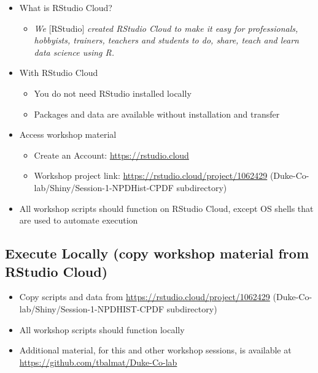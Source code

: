 \documentclass[10pt, letterpaper]{article}
\begin{document}
\begin{spacing}{1.0}
\begin{itemize}
    \item What is RStudio Cloud?
    \begin{itemize}
        \item \textit{We} {[RStudio]} \textit{created RStudio Cloud to make it easy for professionals, hobbyists, trainers, teachers and students to do, share, teach and learn data science using R.}
    \end{itemize}
    \item With RStudio Cloud
    \begin{itemize}
        \item You do not need RStudio installed locally
        \item Packages and data are available without installation and transfer
    \end{itemize}
    \item Access workshop material
    \begin{itemize}
        \item Create an Account:  \url{https://rstudio.cloud}
        \item Workshop project link:  \url{https://rstudio.cloud/project/1062429} (Duke-Co-lab/Shiny/Session-1-NPDHist-CPDF subdirectory)
    \end{itemize}
    \item All workshop scripts should function on RStudio Cloud, except OS shells that are used to automate execution
\end{itemize}

\subsection{Execute Locally (copy workshop material from RStudio Cloud)}\label{sec:materialgit}

\begin{itemize}
    \item Copy scripts and data from \url{https://rstudio.cloud/project/1062429} (Duke-Co-lab/Shiny/Session-1-NPDHIST-CPDF subdirectory)
    \item All workshop scripts should function locally
    \item Additional material, for this and other workshop sessions, is available at \url{https://github.com/tbalmat/Duke-Co-lab}
\end{itemize}



\end{spacing}
\end{document}
